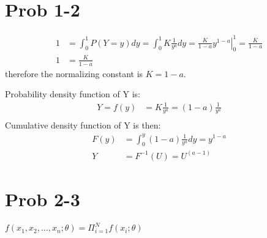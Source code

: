 \documentclass[12pt]{article}
\begin{document}
\section{Prob 1-2}
\begin{align*}
	1 &= \int_0^1 P(Y=y) dy = \int_0^1 K \frac{1}{y^a} dy = \left. \frac{K}{1-a} y^{1-a} \right \rvert_0^1 =  \frac{K}{1-a}\\
	1 &= \frac{K}{1-a}
\end{align*}
therefore the normalizing constant is $K = 1-a$. 

Probability density function of Y is:
\begin{align*}
	Y = f(y) &= K \frac{1}{y^a} = (1-a) \frac{1}{y^a} \\
\end{align*}
Cumulative density function of Y is then:
\begin{align*}
	F(y) &= \int_0^y (1-a) \frac{1}{y^a} dy = y^{1-a}\\
	Y &= F^{-1}(U) = U^{(a-1)}
\end{align*}

\section{Prob 2-3}
$f(x_1,x_2,\ldots,x_n; \theta) = \Pi_{i=1}^N f(x_i; \theta)$ 
\end{document}
